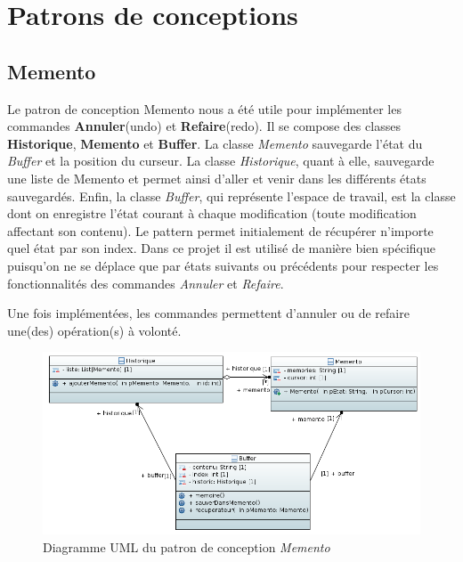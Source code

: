 \documentclass[a4paper,11pt]{article}
\begin{document}
\section{Patrons de conceptions}\label{sec:pattern}
\bigskip

\subsection{Memento}\label{subsec:memento}
Le patron de conception Memento nous a été utile pour implémenter les commandes \textbf{Annuler}(undo) et \textbf{Refaire}(redo). Il se compose des classes \textbf{Historique}, \textbf{Memento} et \textbf{Buffer}.
La classe \emph{Memento} sauvegarde l'état du \emph{Buffer} et la position du curseur. La classe \emph{Historique}, quant à elle, sauvegarde une liste de Memento et permet ainsi d'aller et venir dans les différents états sauvegardés. Enfin, la classe \emph{Buffer}, qui représente l'espace de travail, est la classe dont on enregistre l'état courant à chaque modification (toute modification affectant son contenu).
Le pattern permet initialement de récupérer n'importe quel état par son index. Dans ce projet il est utilisé de manière bien spécifique puisqu'on ne se déplace que par états suivants ou précédents pour respecter les fonctionnalités des commandes \emph{Annuler} et \emph{Refaire}.
\smallskip

\noindent Une fois implémentées, les commandes permettent d'annuler ou de refaire une(des) opération(s) à volonté.

\vspace{2cm}

\begin{figure}[h!]
   \centerline{\includegraphics[scale=0.7]{DiagrammeMemento.png}}
   \caption{\label{diaMemento} Diagramme UML du patron de conception \emph{Memento}}
\end{figure}
\end{document}
